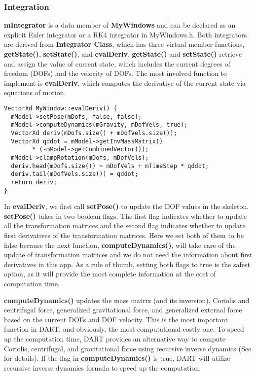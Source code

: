 \subsubsection{Integration}
\textbf{mIntegrator} is a data member of \textbf{MyWindows} and can be
declared as an explicit Euler integrator or a RK4 integrator in
MyWindows.h. Both integrators are derived from \textbf{Integrator
  Class}, which has three virtual member functions,
\textbf{getState()}, \textbf{setState()}, and
\textbf{evalDeriv}. \textbf{getState()} and \textbf{setState()}
retrieve and assign the value of current state, which includes the
current degrees of freedom (DOFs) and the velocity of DOFs. The most
involved function to implement is \textbf{evalDeriv}, which computes
the derivative of the current state via equations of motion.

\ttfamily
\begin{lstlisting}[caption=MyWindows.cpp]
VectorXd MyWindow::evalDeriv() {
  mModel->setPose(mDofs, false, false);
  mModel->computeDynamics(mGravity, mDofVels, true);
  VectorXd deriv(mDofs.size() + mDofVels.size());
  VectorXd qddot = mModel->getInvMassMatrix() 
        * (-mModel->getCombinedVector());
  mModel->clampRotation(mDofs, mDofVels);
  deriv.head(mDofs.size()) = mDofVels + mTimeStep * qddot;
  deriv.tail(mDofVels.size()) = qddot;
  return deriv;
}
\end{lstlisting}
\rmfamily
In \textbf{evalDeriv}, we first call \textbf{setPose()} to update the
DOF values in the skeleton. \textbf{setPose()} takes in two boolean
flags. The first flag indicates whether to update all the
transformation matrices and the second flag indicates whether to
update first derivatives of the transformation matrices. Here we set
both of them to be false because the next function, 
\textbf{computeDynamics()}, will take care of the update of
transformation matrices and we do not need the information about first
derivatives in this app. As a rule of thumb, setting both flags to
true is the safest option, as it will provide the most complete
information at the cost of computation time.

\textbf{computeDynamics()} updates the mass matrix (and its
inversion), Coriolis and centrifugal force, generalized gravitational force,
and generalized external force based on the current DOFs and DOF
velocity. This is the most important function in DART, and obviously,
the most computational costly one. To speed up the computation time,
DART provides an alternative way to compute Coriolis, centrifugal, and
gravitational force using recursive inverse dynamics (See
\cite{dynamics-tutorial} for details). If the flag in
\textbf{computeDynamics()} is true, DART will utilize recursive
inverse dynamics formula to speed up the computation.


